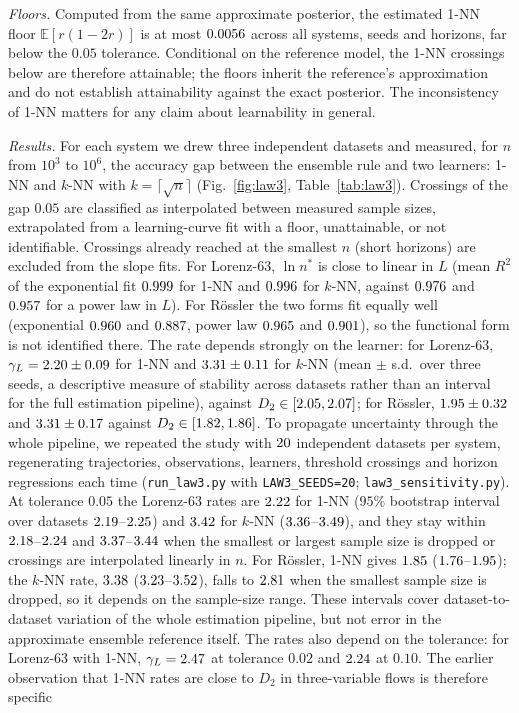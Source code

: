 \documentclass[journal]{IEEEtran}
\theoremstyle{definition}
\newcommand{\E}{\mathbb{E}}
\begin{document}
\emph{Floors.} Computed from the same approximate posterior, the estimated 1-NN floor $\E[r(1-2r)]$ is at most $0.0056$ across all systems, seeds and horizons, far below the $0.05$ tolerance. Conditional on the reference model, the 1-NN crossings below are therefore attainable; the floors inherit the reference's approximation and do not establish attainability against the exact posterior. The inconsistency of 1-NN matters for any claim about learnability in general.

\emph{Results.} For each system we drew three independent datasets and measured, for $n$ from $10^3$ to $10^6$, the accuracy gap between the ensemble rule and two learners: 1-NN and $k$-NN with $k=\lceil\sqrt n\rceil$ (Fig.~\ref{fig:law3}, Table~\ref{tab:law3}). Crossings of the gap $0.05$ are classified as interpolated between measured sample sizes, extrapolated from a learning-curve fit with a floor, unattainable, or not identifiable. Crossings already reached at the smallest $n$ (short horizons) are excluded from the slope fits. For Lorenz-63, $\ln n^*$ is close to linear in $L$ (mean $R^2$ of the exponential fit $0.999$ for 1-NN and $0.996$ for $k$-NN, against $0.976$ and $0.957$ for a power law in $L$). For R\"ossler the two forms fit equally well (exponential $0.960$ and $0.887$, power law $0.965$ and $0.901$), so the functional form is not identified there. The rate depends strongly on the learner: for Lorenz-63, $\gamma_L=2.20\pm0.09$ for 1-NN and $3.31\pm0.11$ for $k$-NN (mean $\pm$ s.d.\ over three seeds, a descriptive measure of stability across datasets rather than an interval for the full estimation pipeline), against $D_2\in[2.05,2.07]$; for R\"ossler, $1.95\pm0.32$ and $3.31\pm0.17$ against $D_2\in[1.82,1.86]$. To propagate uncertainty through the whole pipeline, we repeated the study with $20$ independent datasets per system, regenerating trajectories, observations, learners, threshold crossings and horizon regressions each time (\texttt{run\_law3.py} with \texttt{LAW3\_SEEDS=20}; \texttt{law3\_sensitivity.py}). At tolerance $0.05$ the Lorenz-63 rates are $2.22$ for 1-NN ($95\%$ bootstrap interval over datasets $2.19$--$2.25$) and $3.42$ for $k$-NN ($3.36$--$3.49$), and they stay within $2.18$--$2.24$ and $3.37$--$3.44$ when the smallest or largest sample size is dropped or crossings are interpolated linearly in $n$. For R\"ossler, 1-NN gives $1.85$ ($1.76$--$1.95$); the $k$-NN rate, $3.38$ ($3.23$--$3.52$), falls to $2.81$ when the smallest sample size is dropped, so it depends on the sample-size range. These intervals cover dataset-to-dataset variation of the whole estimation pipeline, but not error in the approximate ensemble reference itself. The rates also depend on the tolerance: for Lorenz-63 with 1-NN, $\gamma_L=2.47$ at tolerance $0.02$ and $2.24$ at $0.10$. The earlier observation that 1-NN rates are close to $D_2$ in three-variable flows is therefore specific 
\end{document}
